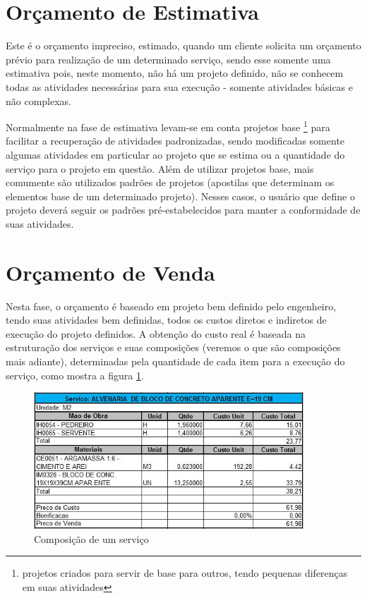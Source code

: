 \section{Orçamento de Estimativa}

Este é o orçamento impreciso, estimado, quando um cliente solicita um orçamento prévio para realização de um determinado serviço, sendo esse somente uma estimativa pois, neste momento, não há um projeto definido, não se conhecem todas as atividades necessárias para sua execução - somente atividades básicas e não complexas.

Normalmente na fase de estimativa levam-se em conta projetos base \footnote{projetos criados para servir de base para outros, tendo pequenas diferenças em suas atividades} para facilitar a recuperação de atividades padronizadas, sendo modificadas somente algumas atividades em particular ao projeto que se estima ou a quantidade do serviço para o projeto em questão. Além de utilizar projetos base, mais comumente são utilizados padrões de projetos (apostilas que determinam os elementos base de um determinado projeto). Nesses casos, o usuário que define o projeto deverá seguir os padrões pré-estabelecidos para manter a conformidade de suas atividades.

\section{Orçamento de Venda}

Nesta fase, o orçamento é baseado em projeto bem definido pelo engenheiro, tendo suas atividades bem definidas, todos os custos diretos e indiretos de execução do projeto definidos.
A obtenção do custo real é baseada na estruturação dos serviços e suas composições (veremos o que são composições mais adiante), determinadas pela quantidade de cada item para a execução do serviço, como mostra a figura \ref{fig:composicao}.

\begin{figure}[htb]
	\centering
	\includegraphics[width=0.9\textwidth]{figuras/composicao.jpg}
	\caption{Composição de um serviço}
	\label{fig:composicao}
\end{figure}


